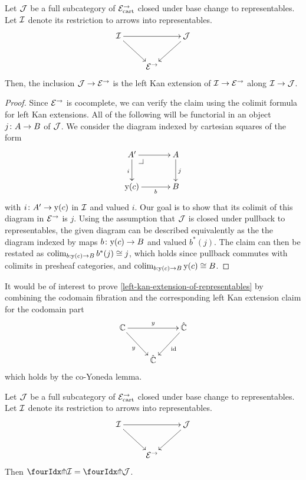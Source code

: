 \documentclass[reqno,10pt,a4paper,oneside]{amsart}
\begin{document}
\begin{lemma}
\label{left-kan-extension-of-representables}
Let $\cal{J}$ be a full subcategory of $\catE_{\cart}^{\to}$ closed under base change to representables.
Let $\cal{I}$ denote its restriction to arrows into representables.
\[
\xymatrix{
  \cal{I}
  \ar[rr]
  \ar[dr]
&&
  \cal{J}
  \ar[dl]
\\&
  \catE^{\to}
}
\]
Then, the inclusion $\cal{J} \to \catE^{\to}$ is the left Kan extension of $\cal{I} \to \catE^{\to}$ along $\cal{I} \to \cal{J}$.
\end{lemma}



\begin{proof}
Since $\catE^{\to}$ is cocomplete, we can verify the claim using  the colimit formula for left Kan extensions.
All of the following will be functorial in an object $j \co A \to B$ of $\cal{J}$.
We consider the diagram indexed by cartesian squares of the form
\[
\xymatrix@C=1.2cm{
  A'
  \ar[r]
  \ar[d]_{i}
  \pullback{dr}
&
  A
  \ar[d]^{j}
\\
  \yon(c) 
  \ar[r]_-b 
&
  B
}
\]
with $i \co A' \to \yon(c)$ in $\cal{I}$ and valued $i$.
Our goal is to show that its colimit of this diagram in $\catE^{\to}$ is $j$.
Using the assumption that $\cal{J}$ is closed under pullback to representables, the given diagram
can be described equivalently as the the diagram indexed by maps $b \co \yon(c) \to B$ and valued $b^*(j)$. The claim can then be restated as  $\colim_{b : \yon(c) \to B} b^*(j) \iso j$, which 
holds since pullback commutes with colimits in presheaf categories, and  $\colim_{b : \yon(c) \to B} \yon(c) \iso B$.
\end{proof}


\begin{remark} It would be of interest to prove \cref{left-kan-extension-of-representables} by combining 
the codomain fibration and the corresponding left Kan extension claim for the codomain part
\[
\xymatrix{
  \cat{C}
  \ar[rr]^{y}
  \ar[dr]_{y}
&&
  \hat{\catC}
  \ar[dl]^{\id}
\\&
  \hat{\cat{C}}
}
\]
which holds by the co-Yoneda lemma.
\end{remark}



\begin{lemma}
\label{awfs-on-arrows-into-representables}
Let $\cal{J}$ be a full subcategory of $\catE_{\cart}^{\to}$ closed under base change to representables.
Let $\cal{I}$ denote its restriction to arrows into representables.
\[
\xymatrix{
  \cal{I}
  \ar[rr]
  \ar[dr]
&&
  \cal{J}
  \ar[dl]
\\&
  \catE^{\to}
}
\]
Then $\liftr{\cal{I}} = \liftr{\cal{J}}$.
\end{lemma}
\end{document}
